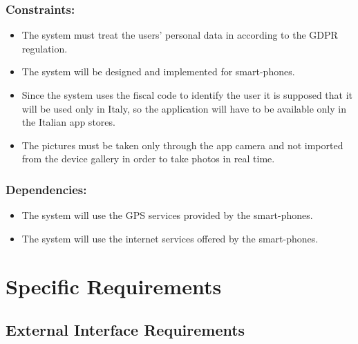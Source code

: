 \documentclass[titlepage]{article}
\begin{document}
\subsubsection{Constraints: }
\begin{itemize}
	\item  The system must treat the users' personal data in according to the GDPR regulation.
	\item The system will be designed and implemented for smart-phones.
	\item Since the system uses the fiscal code to identify the user it is supposed that it will be used only in Italy, so the application will have to be available only in the Italian app stores.
	\item The pictures must be taken only through the app camera and not imported from the device gallery in order to take photos in real time.
\end{itemize}

\subsubsection{Dependencies: }
\begin{itemize}
	\item The system will use the GPS services provided by the smart-phones.
	\item The system will use the internet services offered by the smart-phones.\\
\end{itemize}



\section{Specific Requirements}
\subsection{External Interface Requirements}
\end{document}
